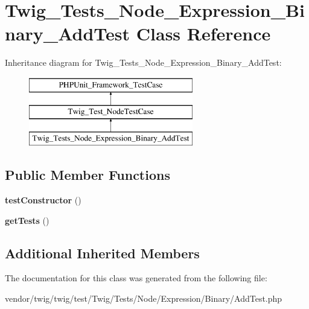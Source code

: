 \hypertarget{classTwig__Tests__Node__Expression__Binary__AddTest}{}\section{Twig\+\_\+\+Tests\+\_\+\+Node\+\_\+\+Expression\+\_\+\+Binary\+\_\+\+Add\+Test Class Reference}
\label{classTwig__Tests__Node__Expression__Binary__AddTest}
Inheritance diagram for Twig\+\_\+\+Tests\+\_\+\+Node\+\_\+\+Expression\+\_\+\+Binary\+\_\+\+Add\+Test\+:\begin{figure}[H]
\begin{center}
\leavevmode
\includegraphics[height=3.000000cm]{classTwig__Tests__Node__Expression__Binary__AddTest}
\end{center}
\end{figure}
\subsection*{Public Member Functions}
\begin{DoxyCompactItemize}
\item 
{\bfseries test\+Constructor} ()\hypertarget{classTwig__Tests__Node__Expression__Binary__AddTest_ad112b987db6009714ced7e35b708281c}{}\label{classTwig__Tests__Node__Expression__Binary__AddTest_ad112b987db6009714ced7e35b708281c}

\item 
{\bfseries get\+Tests} ()\hypertarget{classTwig__Tests__Node__Expression__Binary__AddTest_a97a5603d2b9e1227ca4cab76d67a5672}{}\label{classTwig__Tests__Node__Expression__Binary__AddTest_a97a5603d2b9e1227ca4cab76d67a5672}

\end{DoxyCompactItemize}
\subsection*{Additional Inherited Members}


The documentation for this class was generated from the following file\+:\begin{DoxyCompactItemize}
\item 
vendor/twig/twig/test/\+Twig/\+Tests/\+Node/\+Expression/\+Binary/Add\+Test.\+php\end{DoxyCompactItemize}
